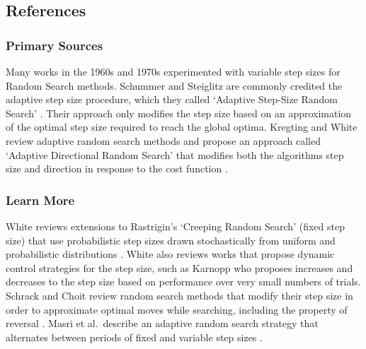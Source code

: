 

\subsection{References}
% 
% 
\subsubsection{Primary Sources}
Many works in the 1960s and 1970s experimented with variable step sizes for Random Search methods. 
Schummer and Steiglitz are commonly credited the adaptive step size procedure, which they called `Adaptive Step-Size Random Search' \cite{Schumer1968}. Their approach only modifies the step size based on an approximation of the optimal step size required to reach the global optima.
Kregting and White review adaptive random search methods and propose an approach called `Adaptive Directional Random Search' that modifies both the algorithms step size and direction in response to the cost function \cite{Kregting1971}.

% 
% 
\subsubsection{Learn More}
White reviews extensions to Rastrigin's `Creeping Random Search' \cite{Rastrigin1963} (fixed step size) that use probabilistic step sizes drawn stochastically from uniform and probabilistic distributions \cite{White1971}. White also reviews works that propose dynamic control strategies for the step size, such as Karnopp \cite{Karnopp1963} who proposes increases and decreases to the step size based on performance over very small numbers of trials.
Schrack and Choit review random search methods that modify their step size in order to approximate optimal moves while searching, including the property of reversal \cite{Schrack1976}.
Masri et al.\ describe an adaptive random search strategy that alternates between periods of fixed and variable step sizes \cite{Masri1980}.


